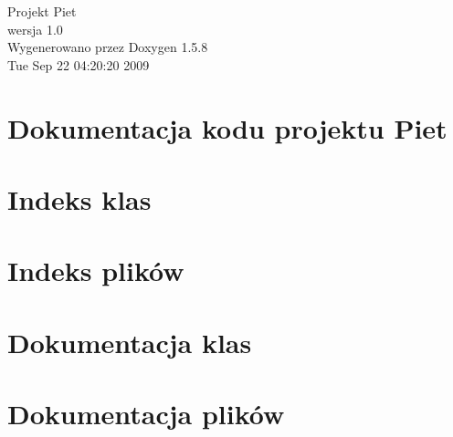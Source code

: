 \documentclass[a4paper]{book}
\begin{document}
\begin{titlepage}
\vspace*{7cm}
\begin{center}
{\Large Projekt Piet \\[1ex]\large wersja 1.0 }\\
\vspace*{1cm}
{\large Wygenerowano przez Doxygen 1.5.8}\\
\vspace*{0.5cm}
{\small Tue Sep 22 04:20:20 2009}\\
\end{center}
\end{titlepage}
\clearemptydoublepage
{}
\tableofcontents
\clearemptydoublepage
{}
\chapter{Dokumentacja kodu projektu Piet}
\label{index}\hypertarget{index}{}
\chapter{Indeks klas}

\chapter{Indeks plików}

\chapter{Dokumentacja klas}







\chapter{Dokumentacja plików}
















\printindex
\end{document}

